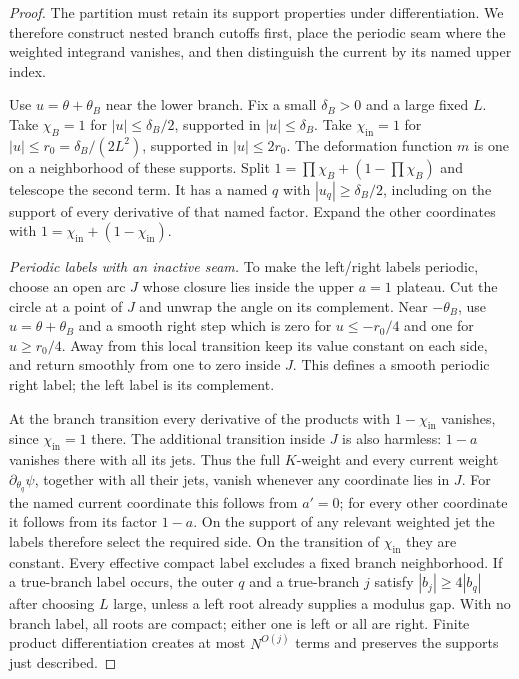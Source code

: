 \documentclass[11pt]{article}
\numberwithin{equation}{section}
\theoremstyle{definition}
\begin{document}
\begin{proof}
The partition must retain its support properties under differentiation. We therefore construct nested branch cutoffs first, place the periodic seam where the weighted integrand vanishes, and then distinguish the current by its named upper index.

Use \(u=\theta+\theta_B\) near the lower branch. Fix a small
\(\delta_B>0\) and a large fixed \(L\).
Take \(\chi_B=1\) for \(|u|\le\delta_B/2\), supported in
\(|u|\le\delta_B\). Take \(\chi_{\mathrm{in}}=1\) for
\(|u|\le r_0=\delta_B/(2L^2)\), supported in \(|u|\le2r_0\).
The deformation function \(m\) is one on a neighborhood of these
supports.
Split \(1=\prod\chi_B+(1-\prod\chi_B)\) and telescope the second
term. It has a named \(q\) with \(|u_q|\ge\delta_B/2\),
including on the support of every derivative of that named factor.
Expand the other coordinates with \(1=\chi_{\mathrm{in}}+(1-\chi_{\mathrm{in}})\).

\smallskip\noindent\textit{Periodic labels with an inactive seam.}
To make the left/right labels periodic, choose an open arc \(J\)
whose closure lies inside the upper \(a=1\) plateau. Cut the circle
at a point of \(J\) and unwrap the angle on its complement. Near
\(-\theta_B\), use \(u=\theta+\theta_B\) and a smooth right step
which is zero for \(u\le-r_0/4\) and one for \(u\ge r_0/4\).
Away from this local transition keep its value constant on each
side, and return smoothly from one to zero inside \(J\).
This defines a smooth periodic right label; the left label is its
complement.

At the branch transition every derivative of the products with
\(1-\chi_{\mathrm{in}}\) vanishes, since \(\chi_{\mathrm{in}}=1\) there. The additional
transition inside \(J\) is also harmless: \(1-a\) vanishes there
with all its jets. Thus the full \(K\)-weight and every current
weight \(\partial_{\theta_q}\psi\), together with all their jets,
vanish whenever any coordinate lies in \(J\). For the named current
coordinate this follows from \(a'=0\); for every other coordinate
it follows from its factor \(1-a\). On the support of any relevant
weighted jet the labels therefore select the required side.
On the transition of \(\chi_{\mathrm{in}}\) they are constant. Every effective
compact label excludes a fixed branch neighborhood.
If a true-branch label occurs, the outer
\(q\) and a true-branch \(j\) satisfy
\(|b_j|\ge4|b_q|\) after choosing \(L\) large, unless a left root
already supplies a modulus gap.
With no branch label, all roots are compact; either one is left or
all are right. Finite product differentiation creates at most
\(N^{O(j)}\) terms and preserves the supports just described.


\end{proof}
\end{document}
